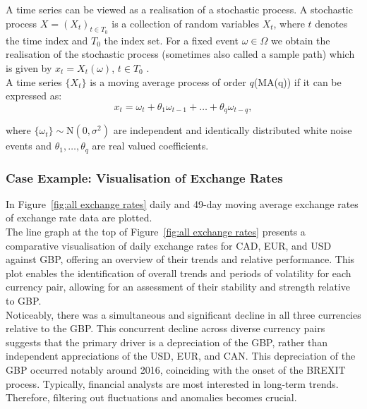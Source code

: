 \documentclass{article}\usepackage[]{graphicx}\usepackage[]{xcolor}
\numberwithin{equation}{section}
\begin{document}
\noindent
A time series can be viewed as a realisation of a stochastic process. A stochastic process $X = (X_t)_{t \in T_0}$ is a collection of random variables $X_t$, where $t$ denotes the time index and $T_0$ the index set. For a fixed event $\omega \in \Omega$ we obtain the realisation of the stochastic process (sometimes also called a sample path) which is given by $x_t = X_t(\omega)$, $t \in T_0$ \cite{Brockwell2016Introduction}.\\

\noindent
A time series $\{X_t\}$ is a moving average process \cite{Brockwell2016Introduction} of order $q$(MA(q)) if it can be expressed as:
\[x_t = \omega_t + \theta_1 \omega_{t-1}+\dots+ \theta_q \omega_{t-q},\]

\noindent
where $\{\omega_t\} \sim \text{N}(0, \sigma^2)$ are independent and identically distributed white noise events and $\theta_1,\dots,\theta_q$ are real valued coefficients.

\subsubsection{Case Example: Visualisation of Exchange Rates}

In Figure~\ref{fig:all exchange rates} daily and 49-day moving average exchange rates of exchange rate data are plotted.\\

\noindent The line graph at the top of Figure~\ref{fig:all exchange rates} presents a comparative visualisation of daily exchange rates for CAD, EUR, and USD against GBP, offering an overview of their trends and relative performance. This plot enables the identification of overall trends and periods of volatility for each currency pair, allowing for an assessment of their stability and strength relative to GBP.\\

\noindent Noticeably, there was a simultaneous and significant decline in all three currencies relative to the GBP. This concurrent decline across diverse currency pairs suggests that the primary driver is a depreciation of the GBP, rather than independent appreciations of the USD, EUR, and CAN. This depreciation of the GBP occurred notably around 2016, coinciding with the onset of the BREXIT process. Typically, financial analysts are most interested in long-term trends. Therefore, filtering out fluctuations and anomalies becomes crucial.\\
\end{document}
